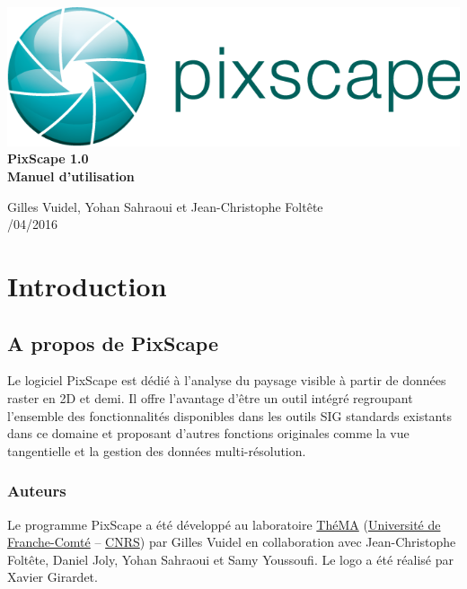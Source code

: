 \documentclass{report}
\begin{document}
 \begin{titlepage}
	
	\centering
	\includegraphics[scale=0.5]{img/logo.png}\\
	
	\bigskip
	\bigskip
	\bigskip	
	{\Huge
		\bfseries
		PixScape 1.0\\
		\bigskip
		Manuel d’utilisation\\
	}
	\bigskip
	\bigskip
	\bigskip
	\bigskip
	\bigskip
	
	{\Large		
		Gilles Vuidel, Yohan Sahraoui et Jean-Christophe Foltête\\
		/04/2016\\
	}
	
\end{titlepage}

\setcounter{tocdepth}{2}
\tableofcontents

\pagebreak

\chapter{Introduction}

\section{A propos de PixScape}

Le logiciel PixScape est dédié à l'analyse du paysage visible à partir de données raster en 2D et demi. Il offre l’avantage d’être un outil intégré regroupant l’ensemble des fonctionnalités disponibles dans les outils SIG standards existants dans ce domaine et proposant d’autres fonctions originales comme la vue tangentielle et la gestion des données multi-résolution.


\subsection{Auteurs}
Le programme PixScape a été développé au laboratoire \href{http://thema.univ-fcomte.fr}{ThéMA} (\href{http://www.univ-fcomte.fr}{Université de Franche-Comté} – \href{http://www.cnrs.fr}{CNRS}) par Gilles Vuidel en collaboration avec Jean-Christophe Foltête, Daniel Joly, Yohan Sahraoui et Samy Youssoufi. Le logo a été réalisé par Xavier Girardet.
\end{document}
